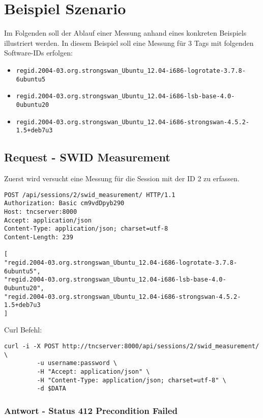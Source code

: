 \documentclass[10pt,a4paper]{scrartcl}
\begin{document}
\pagebreak
\section{Beispiel Szenario}
Im Folgenden soll der Ablauf einer Messung anhand eines konkreten Beispiels
illustriert werden. In diesem Beispiel soll eine Messung für 3 Tags mit
folgenden Software-IDs erfolgen:
\begin{itemize}
	\item \texttt{regid.2004-03.org.strongswan\_Ubuntu\_12.04-i686-logrotate-3.7.8-6ubuntu5}
	\item \texttt{regid.2004-03.org.strongswan\_Ubuntu\_12.04-i686-lsb-base-4.0-0ubuntu20}
	\item \texttt{regid.2004-03.org.strongswan\_Ubuntu\_12.04-i686-strongswan-4.5.2-1.5+deb7u3}
\end{itemize}

\subsection{Request - SWID Measurement}
Zuerst wird versucht eine Messung für die Session mit der ID 2 zu erfassen.

\begin{small}\begin{lstlisting}
POST /api/sessions/2/swid_measurement/ HTTP/1.1
Authorization: Basic cm9vdDpyb290
Host: tncserver:8000
Accept: application/json
Content-Type: application/json; charset=utf-8
Content-Length: 239

[
"regid.2004-03.org.strongswan_Ubuntu_12.04-i686-logrotate-3.7.8-6ubuntu5",
"regid.2004-03.org.strongswan_Ubuntu_12.04-i686-lsb-base-4.0-0ubuntu20",
"regid.2004-03.org.strongswan_Ubuntu_12.04-i686-strongswan-4.5.2-1.5+deb7u3
]
\end{lstlisting}\end{small}

Curl Befehl:

\begin{small}\begin{lstlisting}
curl -i -X POST http://tncserver:8000/api/sessions/2/swid_measurement/ \
		 -u username:password \
		 -H "Accept: application/json" \
		 -H "Content-Type: application/json; charset=utf-8" \
		 -d $DATA
\end{lstlisting}\end{small}

\subsubsection{Antwort - Status 412 Precondition Failed}
\end{document}
